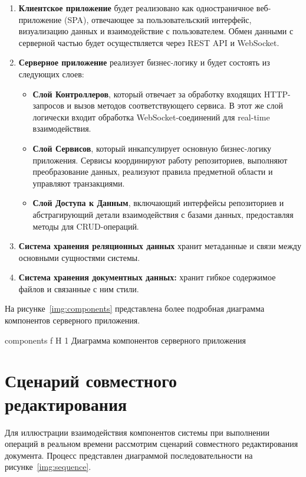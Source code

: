 \begin{enumerate}[wide=12.5mm, leftmargin=12.5mm]
    \item \textbf{Клиентское приложение} будет реализовано как одностраничное веб-приложение (SPA), отвечающее за пользовательский интерфейс, визуализацию данных и взаимодействие с пользователем. Обмен данными с серверной частью будет осуществляется через REST API и WebSocket.
    \item \textbf{Серверное приложение} реализует бизнес-логику и будет состоять из следующих слоев:
        \begin{itemize}
            \item \textbf{Слой Контроллеров}, который отвечает за обработку входящих HTTP-запросов и вызов методов соответствующего сервиса. В этот же слой логически входит обработка WebSocket-соединений для real-time взаимодействия.
            \item \textbf{Слой Сервисов}, который инкапсулирует основную бизнес-логику приложения. Сервисы координируют работу репозиториев, выполняют преобразование данных, реализуют правила предметной области и управляют транзакциями.
            \item \textbf{Слой Доступа к Данным}, включающий интерфейсы репозиториев и абстрагирующий детали взаимодействия с базами данных, предоставляя методы для CRUD-операций.
        \end{itemize}
    \item \textbf{Система хранения реляционных данных} хранит метаданные и связи между основными сущностями системы.
    \item \textbf{Система хранения документных данных:} хранит гибкое содержимое файлов и связанные с ним стили.
\end{enumerate}

На рисунке~\ref{img:components} представлена более подробная диаграмма компонентов серверного приложения.

	{components}
	{f}
	{H}
	{1\textwidth}
	{Диаграмма компонентов серверного приложения}


\section{Сценарий совместного редактирования}

Для иллюстрации взаимодействия компонентов системы при выполнении операций в реальном времени рассмотрим сценарий совместного редактирования документа. 
Процесс представлен диаграммой последовательности на рисунке~\ref{img:sequence}.

